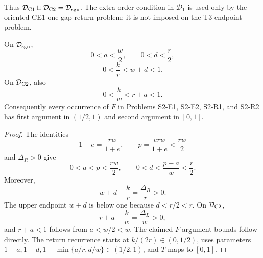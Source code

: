 Thus \(\mathcal D_{\rm C1}\sqcup\mathcal D_{\rm C2}
=\mathcal D_{\rm sgn}\).  The extra order condition in \(\mathcal D_1\) is
used only by the oriented CE1 one-gap return problem; it is not imposed on the
T3 endpoint problem.

\begin{proposition}
\label{prop:s2-pure-domain-bounds}
On \(\mathcal D_{\rm sgn}\),
\[
 0<a<\frac w2,\qquad
 0<d<\frac r2,
\]
\[
 0<\frac{k}{r}<w+d<1.
\]
On \(\mathcal D_{\rm C2}\), also
\[
 0<\frac{k}{w}<r+a<1.
\]
Consequently every occurrence of \(F\) in Problems S2-E1, S2-E2, S2-R1,
and S2-R2 has first argument in \((1/2,1)\) and second argument in
\([0,1]\).
\end{proposition}

\begin{proof}
The identities
\[
 1-e=\frac{rw}{1+e},
 \qquad
 p=\frac{erw}{1+e}<\frac{rw}{2}
\]
and \(\Delta_R>0\) give
\[
 0<a<p<\frac{rw}{2},
 \qquad
 0<d<\frac{p-a}{w}<\frac r2.
\]
Moreover,
\[
 w+d-\frac{k}{r}=\frac{\Delta_R}{r}>0.
\]
The upper endpoint \(w+d\) is below one because \(d<r/2<r\).
On \(\mathcal D_{\rm C2}\),
\[
 r+a-\frac{k}{w}=\frac{\Delta_L}{w}>0,
\]
and \(r+a<1\) follows from \(a<w/2<w\).
The claimed \(F\)-argument bounds follow directly.  The return recurrence
starts at \(k/(2r)\in(0,1/2)\), uses parameters
\(1-a,1-d,1-\min\{a/r,d/w\}\in(1/2,1)\), and \(T\) maps to \([0,1]\).
\end{proof}
